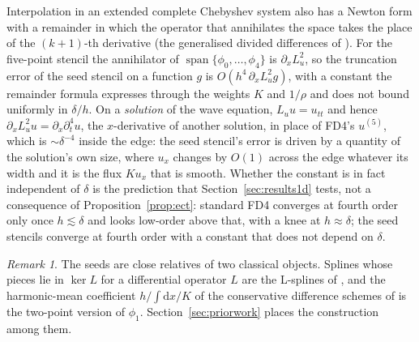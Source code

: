 \documentclass[11pt]{amsart}
\theoremstyle{definition}
\theoremstyle{remark}
\newtheorem{remark}[theorem]{Remark}
\newcommand{\Lu}{L_u}
\newcommand{\px}{\partial_x}
\newcommand{\pt}{\partial_t}
\begin{document}
Interpolation in an extended complete Chebyshev system also has a Newton
form with a remainder in which the operator that annihilates the space
takes the place of the $(k + 1)$-th derivative (the generalised divided
differences of \cite{Muhlbach1973}). For the five-point stencil the
annihilator of $\operatorname{span}\{\phi_0, \ldots, \phi_4\}$ is
$\px \Lu^2$, so the truncation error of the seed stencil on a function
$g$ is $O(h^4\, \px \Lu^2 g)$, with a constant the remainder formula
expresses through the weights $K$ and $1 / \rho$ and does not bound
uniformly in $\delta / h$. On a \emph{solution} of the wave equation,
$\Lu u = u_{tt}$ and hence $\px \Lu^2 u = \px \pt^4 u$, the
$x$-derivative of another solution, in place of FD4's $u^{(5)}$, which is
$\sim \delta^{-4}$ inside the edge: the seed stencil's error is driven by
a quantity of the solution's own size, where $u_x$ changes by $O(1)$
across the edge whatever its width and it is the flux $K u_x$ that is
smooth. Whether the constant is in fact independent of $\delta$ is the
prediction that Section~\ref{sec:results1d} tests, not a consequence of
Proposition~\ref{prop:ect}: standard FD4 converges at fourth order only
once $h \lesssim \delta$ and looks low-order above that, with a knee at
$h \approx \delta$; the seed stencils converge at fourth order with a
constant that does not depend on $\delta$.

\begin{remark}
The seeds are close relatives of two classical objects. Splines whose
pieces lie in $\ker L$ for a differential operator $L$ are the
L-splines of \cite{SchultzVarga1967}, and the harmonic-mean coefficient
$h / \int \mathrm{d}x / K$ of the conservative difference schemes of
\cite{TikhonovSamarskii1962} is the two-point version of $\phi_1$.
Section~\ref{sec:priorwork} places the construction among them.
\end{remark}
\end{document}
